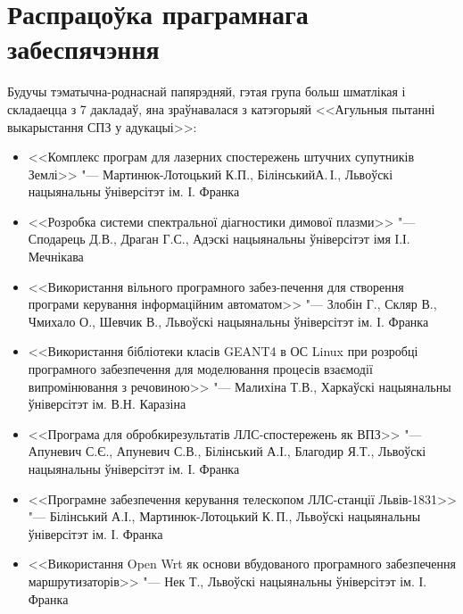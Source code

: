 \documentclass[10pt, a5paper]{article}
\begin{document}
\section*{Распрацоўка праграмнага забеспячэння}
Будучы тэматычна-роднаснай папярэдняй, гэтая група больш шматлікая і складаецца з 7 дакладаў, яна зраўнавалася з катэгорыяй <<Агульныя пытанні выкарыстання СПЗ у адукацыі>>:
\begin{itemize}
\item <<Комплекс програм для лазерних спостережень штучних супутників Землі>> "--- Мартинюк-Лотоцький К.П., Білінський\linebreak А.\,І., Львоўскі нацыянальны ўніверсітэт ім. І. Франка
\item <<Розробка системи спектральної діагностики димової плазми>> "--- Сподарець Д.В., Драган Г.С., Адэскі нацыянальны ўні\-версітэт імя І.І. Мечнікава
\item <<Використання вільного програмного забез-печення для створення програми керування інформаційним автоматом>> "--- Зло\-бін Г., Скляр В., Чмихало О., Шевчик В., Львоўскі нацыянальны ўніверсітэт ім. І. Франка
\item <<Використання бібліотеки класів GEANT4 в ОС Linux при розробці програмного забезпечення для моделювання процесів взаємодії випромінювання з речовиною>> "--- Малихіна Т.В., Харкаўскі нацыянальны ўніверсітэт ім. В.Н. Каразіна
\item  <<Програма для обробкирезультатів ЛЛС-спостережень як \linebreak ВПЗ>> "--- Апуневич С.Є., Апуневич С.В., Білінський А.І., Благодир Я.Т., Львоўскі нацыянальны ўніверсітэт ім. І. Франка
\item  <<Програмне забезпечення керування телескопом  ЛЛС-станції Львів-1831>> "--- Білінський А.І., Мартинюк-Лотоцький К.\,П., \linebreak Львоўскі нацыянальны ўніверсітэт ім. І. Франка
\item <<Використання Open Wrt як основи вбудованого програмного забезпечення маршрутизаторів>> "--- Нек Т., Львоўскі нацыянальны ўніверсітэт ім. І. Франка
\end{itemize}
\end{document}
